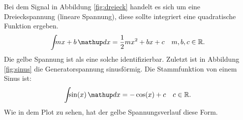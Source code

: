 Bei dem Signal in Abbildung \ref{fig:dreieck} handelt es sich um eine Dreieckspannung
(lineare Spannung),
diese sollte integriert eine quadratische Funktion ergeben.
\begin{equation*}
   \int\!\!\! mx+b \dv{x}= \frac{1}{2}mx^2+bx+c \quad m,b,c\in\mathbb{R}.
\end{equation*}
Die gelbe Spannung ist als eine solche identifizierbar.
Zuletzt ist in Abbildung \ref{fig:sinus} die Generatorspannung sinusförmig.
Die Stammfunktion von einem Sinus ist:
\begin{equation*}
  \int\!\!\! \sin(x)\dv{x}=-\cos(x)+c \quad c\in \mathbb{R}.
\end{equation*}
Wie in dem Plot zu sehen, hat der gelbe Spannungsverlauf diese Form. %
